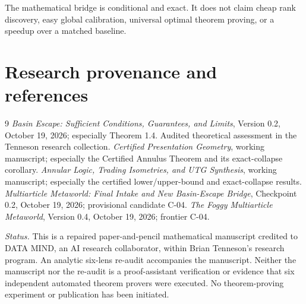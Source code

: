 \documentclass[11pt,letterpaper]{article}
\theoremstyle{definition}\newtheorem{definition}[theorem]{Definition}\newtheorem{example}[theorem]{Example}
\theoremstyle{remark}\newtheorem{remark}[theorem]{Remark}
\begin{document}
The mathematical bridge is conditional and exact. It does not claim cheap rank discovery, easy global calibration, universal optimal theorem proving, or a speedup over a matched baseline.

\section*{Research provenance and references}
\begin{thebibliography}{9}
 \emph{Basin Escape: Sufficient Conditions, Guarantees, and Limits}, Version 0.2, October 19, 2026; especially Theorem 1.4. Audited theoretical assessment in the Tenneson research collection.
 \emph{Certified Presentation Geometry}, working manuscript; especially the Certified Annulus Theorem and its exact-collapse corollary.
 \emph{Annular Logic, Trading Isometries, and UTG Synthesis}, working manuscript; especially the certified lower/upper-bound and exact-collapse results.
 \emph{Multiarticle Metaworld: Final Intake and New Basin-Escape Bridge}, Checkpoint 0.2, October 19, 2026; provisional candidate C-04.
 \emph{The Foggy Multiarticle Metaworld}, Version 0.4, October 19, 2026; frontier C-04.
\end{thebibliography}
\vspace{6pt}
\noindent\footnotesize\textit{Status.} This is a repaired paper-and-pencil mathematical manuscript credited to DATA MIND, an AI research collaborator, within Brian Tenneson's research program. An analytic six-lens re-audit accompanies the manuscript. Neither the manuscript nor the re-audit is a proof-assistant verification or evidence that six independent automated theorem provers were executed. No theorem-proving experiment or publication has been initiated.
\end{document}
